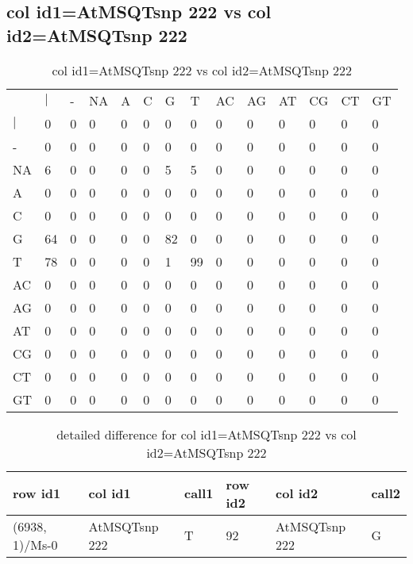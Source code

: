 \subsection{col id1=AtMSQTsnp 222 vs col id2=AtMSQTsnp 222}
\begin{center}
\begin{longtable}{|l|l|l|l|l|l|l|l|l|l|l|l|l|l|}
\caption{col id1=AtMSQTsnp 222 vs col id2=AtMSQTsnp 222} \label{table_dm780}\\
\hline
\\
\hline
&$|$&-&NA&A&C&G&T&AC&AG&AT&CG&CT&GT\\
$|$&0&0&0&0&0&0&0&0&0&0&0&0&0\\
-&0&0&0&0&0&0&0&0&0&0&0&0&0\\
NA&6&0&0&0&0&5&5&0&0&0&0&0&0\\
A&0&0&0&0&0&0&0&0&0&0&0&0&0\\
C&0&0&0&0&0&0&0&0&0&0&0&0&0\\
G&64&0&0&0&0&82&0&0&0&0&0&0&0\\
T&78&0&0&0&0&1&99&0&0&0&0&0&0\\
AC&0&0&0&0&0&0&0&0&0&0&0&0&0\\
AG&0&0&0&0&0&0&0&0&0&0&0&0&0\\
AT&0&0&0&0&0&0&0&0&0&0&0&0&0\\
CG&0&0&0&0&0&0&0&0&0&0&0&0&0\\
CT&0&0&0&0&0&0&0&0&0&0&0&0&0\\
GT&0&0&0&0&0&0&0&0&0&0&0&0&0\\
\hline
\end{longtable}
\end{center}

\begin{center}
\begin{longtable}{|l|l|l|l|l|l|}
\caption{detailed difference for col id1=AtMSQTsnp 222 vs col id2=AtMSQTsnp 222} \label{table_dm781}\\
\hline
row id1&col id1&call1&row id2&col id2&call2\\
\hline
(6938, 1)/Ms-0&AtMSQTsnp 222&T&92&AtMSQTsnp 222&G\\
\hline
\end{longtable}
\end{center}

